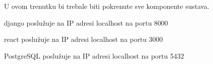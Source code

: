 				\item U ovom trenutku bi trebale biti pokrenute sve komponente sustava.
				\item django poslužuje na IP adresi localhost na portu 8000
				\item react poslužuje na IP adresi localhost na portu 3000
				\item PostgreSQL poslužuje na IP adresi localhost na portu 5432
				
				
			\eject 